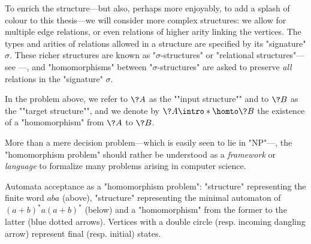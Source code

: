 To enrich the structure---but also, perhaps more enjoyably,
to add a splash of colour to this thesis---we will consider more complex structures: 
we allow for multiple edge relations, or even relations of higher arity linking the vertices.
The types and arities of relations allowed in a structure are specified by its "signature" $\sigma$.
These richer structures are known as "$\sigma$-structures" or "relational structures"---see
---, and
"homomorphisms" between "$\sigma$-structures" are asked to preserve \emph{all} relations
in the "signature" $\sigma$.


In the problem above, we refer to $\?A$ as the \AP""input structure""
and to $\?B$ as the ""target structure"", and we denote by \AP$\?A \intro*\homto \?B$
the existence of a "homomorphism" from $\?A$ to $\?B$.

More than a mere decision problem---which is easily seen to lie in "NP"---,
the "homomorphism problem" should rather be understood as a \emph{framework} or
\emph{language} to formalize many problems arising in computer science.

\begin{marginfigure}
	\centering
	\caption{
		\AP\label{fig:example-automaton-as-rel}
		Automata acceptance as a "homomorphism problem":
		"structure" representing the finite word $aba$ (above),
		"structure" representing the minimal automaton of $(a+b)^* a (a+b)^*$
		(below) and a "homomorphism" from the former to the latter (blue dotted arrows).
		Vertices with a double circle (resp. incoming dangling arrow) represent
		final (resp. initial) states.
	}
\end{marginfigure}

